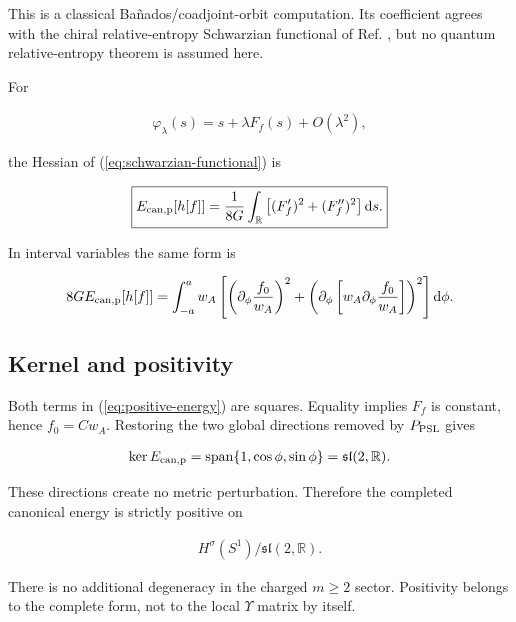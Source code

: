 This is a classical Bañados/coadjoint-orbit computation. Its coefficient agrees with the chiral relative-entropy Schwarzian functional of Ref. \cite{Hollands:2019hje}, but no quantum relative-entropy theorem is assumed here.

For

\begin{align}
\varphi_\lambda(s)=s+\lambda F_f(s)+O(\lambda^2),
\end{align}

the Hessian of (\ref{eq:schwarzian-functional}) is

\begin{align}
\boxed{
E_{{\rm can,p}}[h[f]]
=\frac1{8G}\int_{\mathbb R}
\left[(F_f')^2+(F_f'')^2\right]\mathrm ds .
} \label{eq:positive-energy}
\end{align}

In interval variables the same form is

\begin{align}
8G E_{{\rm can,p}}[h[f]]
=\int_{-a}^{a}w_A
\left[
\left(\partial_\phi\frac{f_0}{w_A}\right)^2
+\left(
\partial_\phi\left[
w_A\partial_\phi\frac{f_0}{w_A}
\right]
\right)^2
\right]\mathrm d\phi . \label{eq:interval-energy}
\end{align}

\subsection{Kernel and positivity}\label{subsec:kernel-positivity}

Both terms in (\ref{eq:positive-energy}) are squares. Equality implies $F_f$ is constant, hence $f_0=Cw_A$. Restoring the two global directions removed by $P_{\rm PSL}$ gives

\begin{align}
\ker E_{{\rm can,p}}
=\operatorname{span}\{1,\cos\phi,\sin\phi\}
=\mathfrak{sl}(2,\mathbb R). \label{eq:energy-kernel}
\end{align}

These directions create no metric perturbation. Therefore the completed canonical energy is strictly positive on

\begin{align}
H^\sigma(S^1)/\mathfrak{sl}(2,\mathbb R).
\end{align}

There is no additional degeneracy in the charged $m\geq2$ sector. Positivity belongs to the complete form, not to the local $\Upsilon$ matrix by itself.

